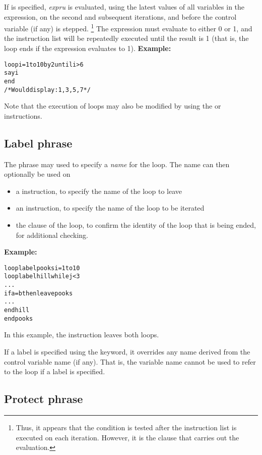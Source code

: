 \begin{description}
If  is specified, \emph{expru} is evaluated, using the
latest values of all variables in the expression, on the second and
subsequent iterations, and before the control variable (if any) is stepped.
\footnote{
Thus, it appears that the  condition is tested after the
instruction list is executed on each iteration.
However, it is the  clause that carries out the evaluation.
}
The expression must evaluate to either 0 or 1, and the instruction list
will be repeatedly executed until the result is 1 (that is, the loop
ends if the expression evaluates to 1).
 \textbf{Example:}
\begin{alltt}
loop i=1 to 10 by 2 until i>6
  say i
  end
/* Would display: 1, 3, 5, 7 */
\end{alltt}
\end{description}
 Note that the execution of loops may also be modified by
using the  or  instructions.
\subsection{Label phrase}
 
The  phrase may used to specify a \emph{name} for the
loop.  The name can then optionally be used on
\begin{itemize}
\item a  instruction, to specify the name of the loop to leave
\item an  instruction, to specify the name of the loop to
be iterated
\item the  clause of the loop, to confirm the identity of the
loop that is being ended, for additional checking.
\end{itemize}
 \textbf{Example:}
\begin{alltt}
loop label pooks i=1 to 10
  loop label hill while j<3
    ...
    if a=b then leave pooks
    ...
    end hill
  end pooks
\end{alltt}
In this example, the  instruction leaves both loops.
 
If a label is specified using the  keyword, it overrides
any name derived from the control variable name (if any).  That is, the
variable name cannot be used to refer to the loop if a label is
specified.
\subsection{Protect phrase}
 

